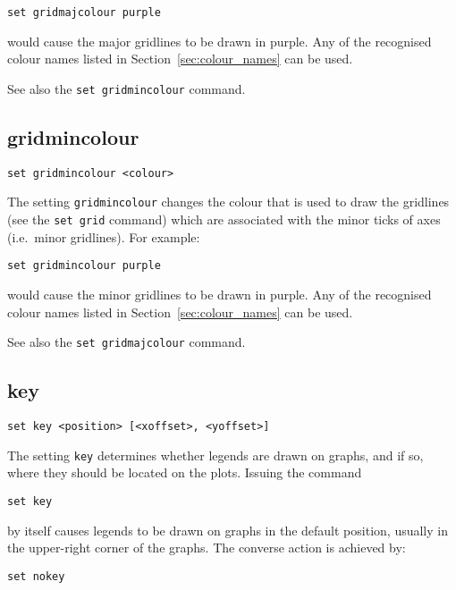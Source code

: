 \begin{verbatim}
set gridmajcolour purple
\end{verbatim}

\noindent would cause the major gridlines to be drawn in purple. Any of the
recognised colour names listed in Section~\ref{sec:colour_names} can be used.

See also the {\tt set gridmincolour} command.


\subsection{gridmincolour}

\begin{verbatim}
set gridmincolour <colour>
\end{verbatim}

The setting {\tt gridmincolour} changes the colour that is used to draw the
gridlines (see the {\tt set grid} command) which are associated with the minor
ticks of axes (i.e.\ minor gridlines). For example:

\begin{verbatim}
set gridmincolour purple
\end{verbatim}

\noindent would cause the minor gridlines to be drawn in purple. Any of the
recognised colour names listed in Section~\ref{sec:colour_names} can be used.

See also the {\tt set gridmajcolour} command.


\subsection{key}

\begin{verbatim}
set key <position> [<xoffset>, <yoffset>]
\end{verbatim}

The setting {\tt key} determines whether legends are drawn on graphs, and if
so, where they should be located on the plots. Issuing the command

\begin{verbatim}
set key
\end{verbatim}

\noindent by itself causes legends to be drawn on graphs in the default
position, usually in the upper-right corner of the graphs. The converse action
is achieved by:

\begin{verbatim}
set nokey
\end{verbatim}

